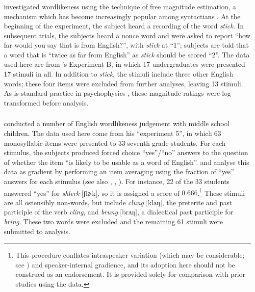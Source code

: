 \subsubsection{\citealt{Greenberg1964}}

\citet{Greenberg1964} investigated wordlikeness using the technique of free magnitude estimation, a mechanism which has become increasingly popular among syntactians \citep[e.g.,][]{Bard1996}. At the beginning of the experiment, the subject heard a recording of the word \emph{stick}. In subsequent trials, the subjects heard a nonce word and were asked to report ``how far would you say that is from English?'', with \emph{stick} at ``1''; subjects are told that a word that is ``twice as far from English'' as \emph{stick} should be scored ``2''. The data used here are from \citeauthor{Greenberg1964}'s Experiment B, in which 17 undergraduates were presented 17 stimuli in all. In addition to \emph{stick}, the stimuli include three other English words; these four items were excluded from further analyses, leaving 13 stimuli. As is standard practice in psychophysics \citep[e.g.,][]{Butler1987}, these magnitude ratings were log-transformed before analysis.

\subsubsection{\citealt{Scholes1966}}

\citet{Scholes1966} conducted a number of English wordlikeness judgement with middle school children. The data used here come from his ``experiment 5'', in which 63 monosyllabic items were presented to 33 seventh-grade students. For each stimulus, the subjects produced forced choice ``yes''/``no'' answers to the question of whether the item ``is likely to be usable as a word of English''. \citet{Hayes2008a} and \citet{Albright2009a} analyse this data as gradient by performing an item averaging using the fraction of ``yes'' answers for each stimulus (see also \citealt{Pierrehumbert1994}, \citealt{Coleman1997}, \citealt{Frisch2000}). For instance, 22 of the 33 students answered ``yes'' for \emph{shlerk} [ʃlɚk], so it is assigned a score of $0.666$.\footnote{This procedure conflates intraspeaker variation (which may be considerable; see \citealt{Shademan2007}) and speaker-internal gradience, and its adoption here should not be construed as an endorsement. It is provided solely for comparison with prior studies using the \citeauthor{Scholes1966} data.} These stimuli are all ostensibly non-words, but include \emph{clung} [klʌŋ], the preterite and past participle of the verb \emph{cling}, and \emph{brung} [brʌŋ], a dialectical past participle for \emph{bring}. These two words were excluded and the remaining 61 stimuli were submitted to analysis. 

